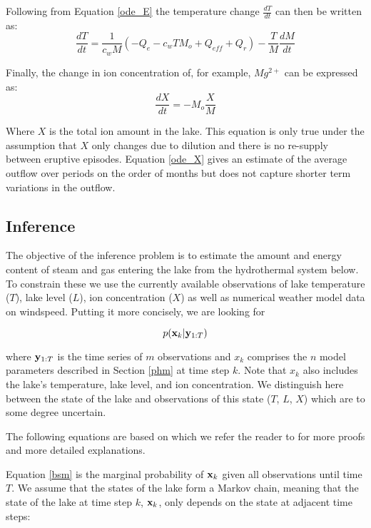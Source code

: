 \documentclass{bmc_template/bmcart}
\newcommand{\bm}[1]{{\bf #1}}
\begin{document}
Following from Equation \ref{ode_E} the temperature change $\frac{dT}{dt}$ can then be written as:
\begin{equation}\label{ode_T}
	\frac{dT}{dt}=\frac{1}{c_wM}\left(-Q_e - c_wTM_o + Q_{eff} + Q_r\right )
	-\frac{T}{M}\frac{dM}{dt}
\end{equation}

Finally, the change in ion concentration of, for example, $Mg^{2+}$ can be expressed as:
\begin{equation}\label{ode_X}
	\frac{dX}{dt}=-M_o\frac{X}{M}
\end{equation}

Where $X$ is the total ion amount in the lake. This equation is only true under
the assumption that $X$ only changes due to dilution and there is no re-supply
between eruptive episodes. Equation \ref{ode_X} gives an estimate of the average
outflow over periods on the order of months but does not capture shorter term
variations in the outflow. 

\subsection*{Inference}\label{inf}

The objective of the inference problem is to estimate the amount and energy
content of steam and gas entering the lake from the hydrothermal system below.
To constrain these we use the currently available observations of lake
temperature ($T$), lake level ($L$), ion concentration ($X$) as well as
numerical weather model data on windspeed. Putting it more concisely, we are
looking for 

\begin{equation}\label{bsm}
    p(\bm{x}_k|\bm{y}_{1:T})
\end{equation}

where $\bm{y}_{1:T}$ is the time series of $m$ observations and $x_k$ comprises
the $n$ model parameters described in Section \ref{phm} at time step $k$. Note
that $x_k$ also includes the lake's temperature, lake level, and ion
concentration. We distinguish here between the state of the lake and
observations of this state ($T$, $L$, $X$) which are to some degree uncertain.

The following equations are based on \citet{Sarkka2010} which we refer the
reader to for more proofs and more detailed explanations.

Equation \ref{bsm} is the marginal probability of $\bm{x}_k$ given all
observations until time $T$. We assume that the states of the lake form a
Markov chain, meaning that the state of the lake at time step $k$, $\bm{x}_k$,
only depends on the state at adjacent time steps:
\end{document}
